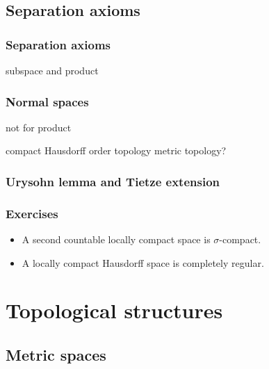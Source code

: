 \documentclass{../note}
\begin{document}
\chapter{Separation axioms}
\section{Separation axioms}
subspace and product


\section{Normal spaces}
not for product

compact Hausdorff
order topology
metric topology?

\section{Urysohn lemma and Tietze extension}



\section*{Exercises}
\begin{prb}
\end{prb}
\begin{prb}
\end{prb}
\begin{prb}
\end{prb}
\begin{prb}
\end{prb}
\begin{prb}
\end{prb}


\begin{itemize}
\item A second countable locally compact space is $\sigma$-compact.
\item A locally compact Hausdorff space is completely regular.
\end{itemize}


\part{Topological structures}

\chapter{Metric spaces}
\end{document}
